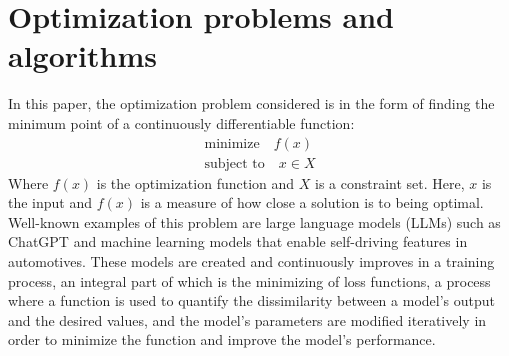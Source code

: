 \section{Optimization problems and algorithms}

In this paper, the optimization problem considered is in the form of finding the minimum point of a continuously differentiable function:
\begin{subequations}\label{opt prob}
  \begin{align}
    \textrm{minimize} \quad f(x) \\
    \textrm{subject to} \quad x \in X
  \end{align}
\end{subequations}
Where \(f(x)\) is the optimization function and \(X\) is a constraint set. Here, \(x\) is the input and \(f(x)\) is a measure of how close a solution is to being optimal. Well-known examples of this problem are large language models (LLMs) such as ChatGPT and machine learning models that enable self-driving features in automotives. These models are created and continuously improves in a training process, an integral part of which is the minimizing of loss functions, a process where a function is used to quantify the dissimilarity between a model's output and the desired values, and the model's parameters are modified iteratively in order to minimize the function and improve the model's performance.

